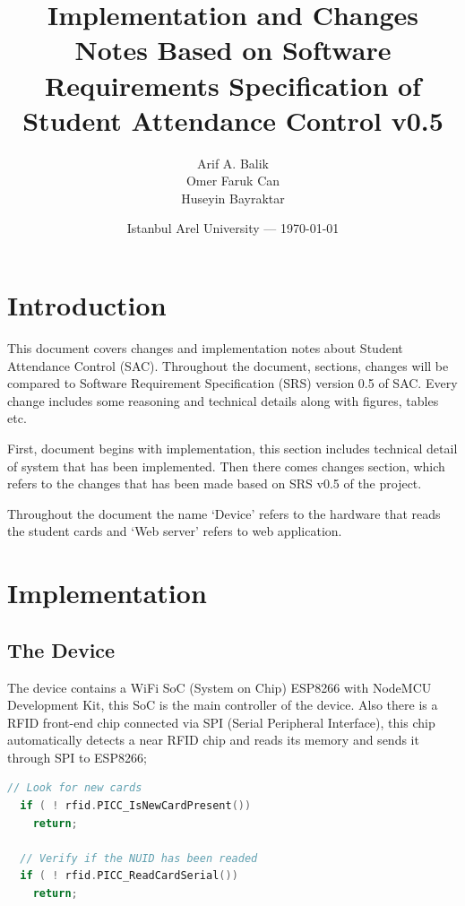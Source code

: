 \documentclass{article}
\title{Implementation and Changes Notes Based on Software Requirements Specification of Student Attendance Control v0.5  } %
\author{Arif A. Balik\\ Omer Faruk Can\\ Huseyin Bayraktar } %
\date{Istanbul Arel University --- \today} %
\begin{document}
\maketitle %


\section*{Introduction} %

This document covers changes and implementation notes about Student Attendance Control (SAC). Throughout the document, sections, changes will be compared to Software Requirement Specification (SRS) version 0.5 of SAC. Every change includes some reasoning and technical details along with figures, tables etc.

First, document begins with implementation, this section includes technical detail of system that has been implemented. Then there comes changes section, which refers to the changes that has been made based on SRS v0.5 of the project.

\begin{info} %
	Throughout the document the name `Device' refers to the hardware that reads the student cards and `Web server' refers to web application.
\end{info}


\section{Implementation} %

\subsection{The Device}

The device contains a WiFi SoC (System on Chip) ESP8266 with NodeMCU Development Kit, this SoC is the main controller of the device. Also there is a RFID front-end chip connected via SPI (Serial Peripheral Interface), this chip automatically detects a near RFID chip and reads its memory and sends it through SPI to ESP8266;
\begin{file}
\begin{lstlisting}[language=C]
  // Look for new cards
  if ( ! rfid.PICC_IsNewCardPresent())
    return;

  // Verify if the NUID has been readed
  if ( ! rfid.PICC_ReadCardSerial())
    return;
\end{lstlisting}
\end{file}
\end{document}
